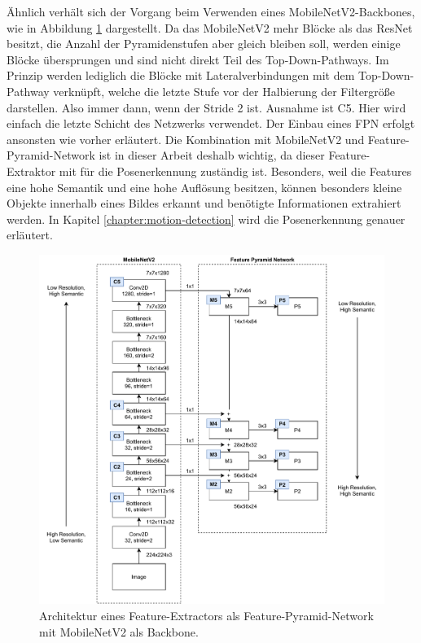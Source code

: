 Ähnlich verhält sich der Vorgang beim Verwenden eines MobileNetV2-Backbones, wie
in Abbildung \ref{fig:mobilenetv2-fpn} dargestellt. Da das MobileNetV2 mehr Blöcke
als das ResNet besitzt, die Anzahl der Pyramidenstufen aber gleich bleiben soll, werden
einige Blöcke übersprungen und sind nicht direkt Teil des Top-Down-Pathways. Im Prinzip
werden lediglich die Blöcke mit Lateralverbindungen mit dem Top-Down-Pathway verknüpft,
welche die letzte Stufe vor der Halbierung der Filtergröße darstellen. Also immer dann,
wenn der Stride 2 ist. Ausnahme ist C5. Hier wird einfach die letzte Schicht des Netzwerks
verwendet. Der Einbau eines FPN erfolgt ansonsten wie vorher erläutert. Die Kombination mit
MobileNetV2 und Feature-Pyramid-Network ist in dieser Arbeit deshalb wichtig, da dieser
Feature-Extraktor mit für die Posenerkennung zuständig ist. Besonders, weil die Features
eine hohe Semantik und eine hohe Auflösung besitzen, können besonders kleine Objekte innerhalb
eines Bildes erkannt und benötigte Informationen extrahiert werden. In Kapitel \ref{chapter:motion-detection}
wird die Posenerkennung genauer erläutert.

\begin{figure}
    \includegraphics[width=\textwidth]{images/MobileNetV2_FPN.pdf}
    \caption{Architektur eines Feature-Extractors als Feature-Pyramid-Network
    mit MobileNetV2 als Backbone.}
    \label{fig:mobilenetv2-fpn}
\end{figure}

